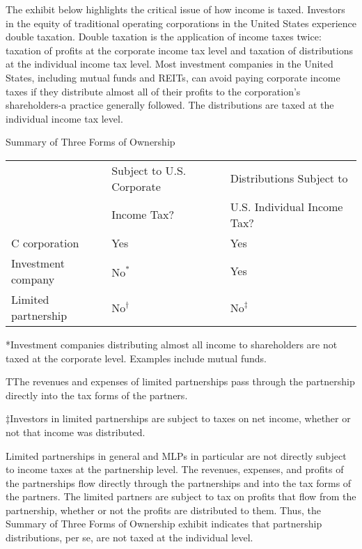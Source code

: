 \documentclass[11pt]{article}
\begin{document}
The exhibit below highlights the critical issue of how income is taxed. Investors in the equity of traditional operating corporations in the United States experience double taxation. Double taxation is the application of income taxes twice: taxation of profits at the corporate income tax level and taxation of distributions at the individual income tax level. Most investment companies in the United States, including mutual funds and REITs, can avoid paying corporate income taxes if they distribute almost all of their profits to the corporation's shareholders-a practice generally followed. The distributions are taxed at the individual income tax level.

Summary of Three Forms of Ownership

\begin{center}
\begin{tabular}{|lll|}
\hline
 & Subject to U.S. Corporate & Distributions Subject to \\
 & Income Tax? & U.S. Individual Income Tax? \\
\hline
C corporation & Yes & Yes \\
Investment company & $\mathrm{No}^{*}$ & Yes \\
Limited partnership & $\mathrm{No}^{\dagger}$ & $\mathrm{No}^{\ddagger}$ \\
\hline
\end{tabular}
\end{center}

*Investment companies distributing almost all income to shareholders are not taxed at the corporate level. Examples include mutual funds.

TThe revenues and expenses of limited partnerships pass through the partnership directly into the tax forms of the partners.

‡Investors in limited partnerships are subject to taxes on net income, whether or not that income was distributed.

Limited partnerships in general and MLPs in particular are not directly subject to income taxes at the partnership level. The revenues, expenses, and profits of the partnerships flow directly through the partnerships and into the tax forms of the partners. The limited partners are subject to tax on profits that flow from the partnership, whether or not the profits are distributed to them. Thus, the Summary of Three Forms of Ownership exhibit indicates that partnership distributions, per se, are not taxed at the individual level.
\end{document}
